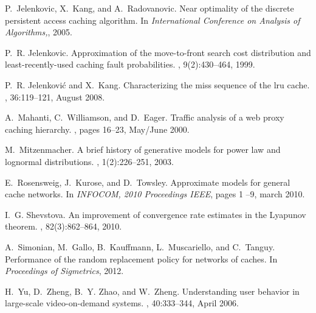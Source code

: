 \documentclass{amsart}
\begin{document}
\begin{thebibliography}{10}
P.~Jelenkovic, X.~Kang, and A.~Radovanovic.
\newblock Near optimality of the discrete persistent access caching algorithm.
\newblock In {\em International Conference on Analysis of Algorithms,}, 2005.

P.~R. Jelenkovic.
\newblock Approximation of the move-to-front search cost distribution and
  least-recently-used caching fault probabilities.
, 9(2):430--464, 1999.

P.~R. Jelenkovi\'{c} and X.~Kang.
\newblock Characterizing the miss sequence of the lru cache.
, 36:119--121, August 2008.

A.~Mahanti, C.~Williamson, and D.~Eager.
\newblock Traffic analysis of a web proxy caching hierarchy.
, pages 16--23, May/June 2000.

M.~Mitzenmacher.
\newblock A brief history of generative models for power law and lognormal
  distributions.
, 1(2):226--251, 2003.

E.~Rosensweig, J.~Kurose, and D.~Towsley.
\newblock Approximate models for general cache networks.
\newblock In {\em INFOCOM, 2010 Proceedings IEEE}, pages 1 --9, march 2010.

I.~G. Shevstova.
\newblock An improvement of convergence rate estimates in the {L}yapunov
  theorem.
, 82(3):862--864, 2010.

A.~Simonian, M.~Gallo, B.~Kauffmann, L.~Muscariello, and C.~Tanguy.
\newblock Performance of the random replacement policy for networks of caches.
\newblock In {\em Proceedings of {S}igmetrics}, 2012.

H.~Yu, D.~Zheng, B.~Y. Zhao, and W.~Zheng.
\newblock Understanding user behavior in large-scale video-on-demand systems.
, 40:333--344, April 2006.

\end{thebibliography}
\end{document}
